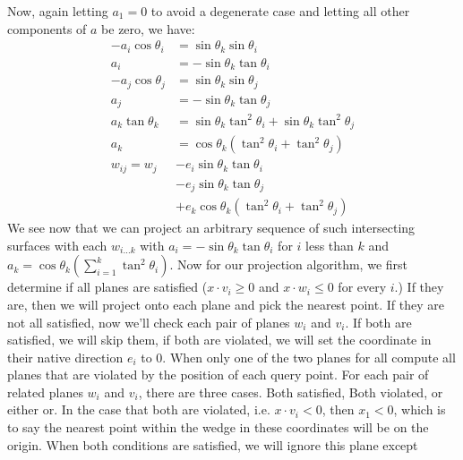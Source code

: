 Now, again letting $a_1 = 0$ to avoid a degenerate case and letting
all other components of $a$ be zero, we have:
\begin{align}
  -a_i \cos \theta_i &= \sin \theta_k \sin \theta_i\\
  a_i &= -\sin \theta_k \tan \theta_i\\
  -a_j \cos \theta_j &= \sin \theta_k \sin \theta_j\\
  a_j &= -\sin \theta_k \tan \theta_j\\
  a_k \tan \theta_k &= \sin \theta_k \tan^2 \theta_i + \sin \theta_k \tan^2 \theta_j\\
  a_k &= \cos \theta_k (\tan^2 \theta_i + \tan^2 \theta_j)\\
  w_{ij} = w_j &- e_i \sin \theta_k \tan \theta_i\\
              &- e_j \sin \theta_k \tan \theta_j\\
              &+ e_k \cos \theta_k (\tan^2 \theta_i + \tan^2 \theta_j)
\end{align}
We see now that we can project an arbitrary sequence of such
intersecting surfaces with each $w_{i...k}$ with $a_i = -\sin \theta_k
\tan \theta_i$ for $i$ less than $k$ and $a_k = \cos \theta_k (\sum_{i
  = 1}^k\tan^2 \theta_i)$. 
Now for our projection algorithm, we first determine if all planes are
satisfied ($x \cdot v_i \geq 0$ and $x \cdot w_i \leq 0$ for every
$i$.) If they are, then we will project onto each plane and pick the
nearest point. If they are not all satisfied, now we'll check each
pair of planes $w_i$ and $v_i$. If both are satisfied, we will skip
them, if both are violated, we will set the coordinate in their native
direction $e_i$ to 0. When only one of the two planes for all compute all planes that are
violated by the position of each query point. For each pair of related
planes $w_i$ and $v_i$, there are three cases. Both satisfied, Both
violated, or either or. In the case that both are violated, i.e. $x
\cdot v_i < 0$, then $x_1 < 0$, which is to say the nearest point
within the wedge in these coordinates will be on the origin. When both
conditions are satisfied, we will ignore this plane except 



